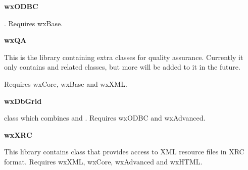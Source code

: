 {\large {\bf wxODBC}}

. Requires wxBase.

{\large {\bf wxQA}}

This is the library containing extra classes for quality assurance. Currently
it only contains  and related classes,
but more will be added to it in the future.

Requires wxCore, wxBase and wxXML.

{\large {\bf wxDbGrid}}

 class which combines 
  and . 
Requires wxODBC and wxAdvanced.

{\large {\bf wxXRC}}

This library contains  class that
provides access to XML resource files in XRC format.
Requires wxXML, wxCore, wxAdvanced and wxHTML.


